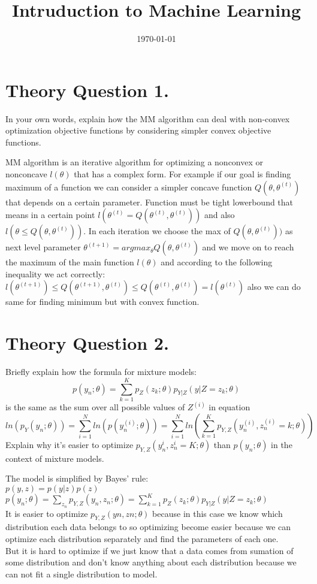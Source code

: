 \documentclass[12pt]{article}
\title{Intruduction to Machine Learning}
\date{\today}
\begin{document}
\maketitlepage
\maketitlestart
\section{Theory Question 1.}
In your own words, explain how the MM algorithm can deal with non-convex optimization objective functions by considering simpler convex objective functions.
\begin{qsolve}[solution]
    MM algorithm is an iterative algorithm for optimizing a nonconvex or nonconcave $l(\theta)$ that has a complex form. For example if our goal is finding maximum of a function we can consider a simpler concave function $Q(\theta,\theta^{(t)})$ that depends on a certain parameter. Function must be tight lowerbound that means in a certain point $l(\theta^{(t)}=Q(\theta^{(t)},\theta^{(t)}))$ and also $l(\theta\leq Q(\theta,\theta^{(t)}))$. In each iteration we choose the max of $Q(\theta,\theta^{(t)}))$ as next level parameter $\theta^{(t+1)}=argmax_{\theta}Q(\theta,\theta^{(t)})$ and we move on to reach the maximum of the main function $l(\theta)$ and according to the following inequality
    we act correctly:
    \\$l(\theta^{(t+1)})\leq Q(\theta^{(t+1)},\theta^{(t)})\leq Q(\theta^{(t)},\theta^{(t)})=l(\theta^{(t)})$
    also we can do same for finding minimum but with convex function.
\end{qsolve}

\section{Theory Question 2.}
Briefly explain how the formula for mixture models:
\begin{equation}
    p(y_n;\theta)=\sum_{k=1}^{K}p_Z(z_k;\theta)p_{Y|Z}(y|Z=z_k;\theta)
\end{equation}
is the same as the sum over all possible values of $Z^{(i)}$ in equation
\begin{equation}
    ln(p_Y(y_n;\theta))=\sum_{i=1}^N ln(p(y^{(i)}_n;\theta))=\sum_{i=1}^N ln(\sum_{k=1}^{K}p_{Y,Z}(y^{(i)}_n,z^{(i)}_n=k;\theta))
\end{equation}
Explain why it’s easier to optimize $p_{Y,Z}(y^{i}_n,z^{i}_n=K;\theta)$ than $p(y_n;\theta)$ in the context of mixture models.
\begin{qsolve}[solution]
    The model is simplified by Bayes' rule:
    \\$p(y,z)=p(y|z)p(z)$
        \\$p(y_n;\theta)=\sum_{z_n}p_{Y,Z}(y_n,z_n;\theta)=\sum_{k=1}^{K}p_Z(z_k;\theta)p_{Y|Z}(y|Z=z_k;\theta)$
    \\It is easier to optimize $p_{Y,Z}(yn, zn; θ)$ because in this case we know which distribution each data belongs to so optimizing become easier because we can optimize each distribution separately and find the parameters of each one.
    \\But it is hard to optimize if we just know that a data comes from sumation of some distribution and don't know anything about each distribution because we can not fit a single distribution to model.
\end{qsolve}
\end{document}
